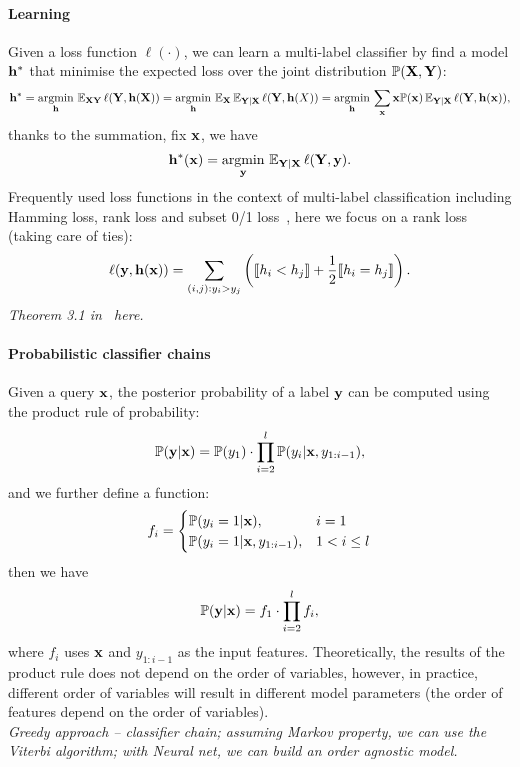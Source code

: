 \noindent
\paragraph{Learning}
Given a loss function $\ell(\cdot)$, 
we can learn a multi-label classifier by find a model $\mathbf{h}^*$ that minimise the expected loss over the joint distribution $\mathbb{P}(\mathbf{X},\mathbf{Y})$:
\begin{equation*}
\mathbf{h}^* 
= \operatorname*{argmin}_{\mathbf{h}} \, \mathbb{E}_{\mathbf{X}\mathbf{Y}} \, \ell(\mathbf{Y},\mathbf{h}(\mathbf{X}))
= \operatorname*{argmin}_{\mathbf{h}} \, \mathbb{E}_{\mathbf{X}} \, \mathbb{E}_{\mathbf{Y}|\mathbf{X}} \, \ell(\mathbf{Y},\mathbf{h}(X))
= \operatorname*{argmin}_{\mathbf{h}} \, \sum_{\mathbf{x}} \mathbf{x} \mathbb{P}(\mathbf{x}) \, \mathbb{E}_{\mathbf{Y}|\mathbf{X}} \, \ell(\mathbf{Y},\mathbf{h}(\mathbf{x})),
\end{equation*}
thanks to the summation, fix $\mathbf{x}$, we have
\begin{equation*}
\mathbf{h}^*(\mathbf{x}) = \operatorname*{argmin}_{\mathbf{y}} \, \mathbb{E}_{\mathbf{Y}|\mathbf{X}} \, \ell(\mathbf{Y},\mathbf{y}).
\end{equation*}
Frequently used loss functions in the context of multi-label classification including Hamming loss, rank loss and subset 0/1 loss~\cite{dembczynski:2010},
here we focus on a rank loss (taking care of ties):
\begin{equation}
\label{eq:loss_rank}
\ell(\mathbf{y}, \mathbf{h}(\mathbf{x})) = \sum_{(i,j): y_i > y_j} \left( \llbracket h_i < h_j \rrbracket + \frac{1}{2} \llbracket h_i = h_j \rrbracket \right).
\end{equation}
\emph{Theorem 3.1 in~\cite{dembczynski:2010} here.}

\noindent
\paragraph{Probabilistic classifier chains}
Given a query $\mathbf{x}$, the posterior probability of a label $\mathbf{y}$ can be computed using the product rule of probability:
\begin{equation*}
\mathbb{P}(\mathbf{y} |\mathbf{x}) = \mathbb{P}(y_1) \cdot \prod_{i=2}^l \mathbb{P}(y_i |\mathbf{x}, y_{1:i-1}),
\end{equation*}
and we further define a function:
\begin{equation*}
f_i = 
\begin{cases}
\mathbb{P}(y_i = 1 |\mathbf{x}), & i = 1 \\
\mathbb{P}(y_i = 1 |\mathbf{x}, y_{1:i-1}), & 1 < i \le l
\end{cases}
\end{equation*}
then we have
\begin{equation*}
\mathbb{P}(\mathbf{y} |\mathbf{x}) = f_1 \cdot \prod_{i=2}^l f_i,
\end{equation*}
where $f_i$ uses $\mathbf{x}$ and $y_{1:i-1}$ as the input features. 
Theoretically, the results of the product rule does not depend on the order of variables, 
however, in practice, different order of variables will result in different model parameters (\ie the order of features depend on the order of variables). \\
\emph{Greedy approach -- classifier chain; assuming Markov property, we can use the Viterbi algorithm; with Neural net, we can build an order agnostic model.}



